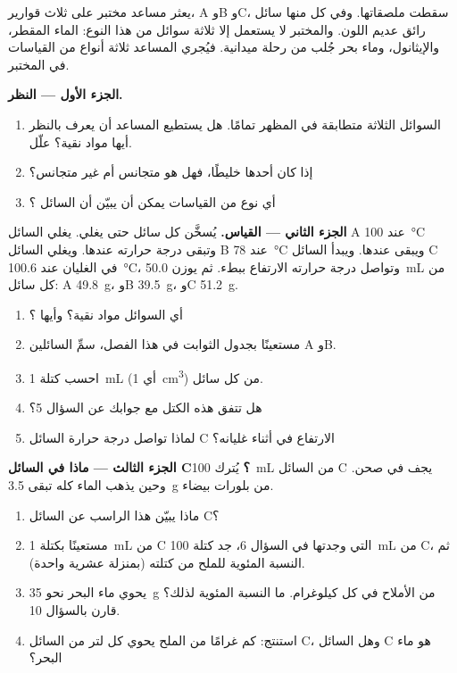 \begin{problem}
\label{pb:g6:pure-substances-and-mixtures:1}
يعثر مساعد مختبر على ثلاث قوارير، A وB وC، سقطت ملصقاتها. وفي كل
منها سائل رائق عديم اللون. والمختبر لا يستعمل إلا ثلاثة سوائل من هذا
النوع: الماء المقطر، والإيثانول، وماء بحر جُلب من رحلة ميدانية. فيُجري
المساعد ثلاثة أنواع من القياسات في المختبر.

\medskip
\noindent\textbf{الجزء الأول --- النظر.}
\begin{enumerate}
  \item السوائل الثلاثة متطابقة في المظهر تمامًا. هل يستطيع المساعد أن
        يعرف بالنظر أيها مواد نقية؟ علّل.
  \item إذا كان أحدها خليطًا، فهل هو متجانس أم غير متجانس؟
  \item أي نوع من القياسات يمكن أن يبيّن أن السائل ؟
\end{enumerate}

\medskip
\noindent\textbf{الجزء الثاني --- القياس.}
يُسخَّن كل سائل حتى يغلي. يغلي السائل A عند
\qty{100}{\celsius} وتبقى درجة حرارته عندها. ويغلي السائل B عند
\qty{78}{\celsius} ويبقى عندها. ويبدأ السائل C في الغليان عند
\qty{100.6}{\celsius}، وتواصل درجة حرارته الارتفاع ببطء. ثم
يوزن \qty{50.0}{mL} من كل سائل: A \qty{49.8}{g}، وB
\qty{39.5}{g}، وC \qty{51.2}{g}.
\begin{enumerate}[resume]
  \item أي السوائل مواد نقية؟ وأيها ؟
  \item مستعينًا بجدول الثوابت في هذا الفصل، سمِّ السائلين A
        وB.
  \item احسب كتلة \qty{1}{mL} (أي \qty{1}{cm^3}) من كل
        سائل.
  \item هل تتفق هذه الكتل مع جوابك عن السؤال 5؟
  \item لماذا تواصل درجة حرارة السائل C الارتفاع في أثناء غليانه؟
\end{enumerate}

\medskip
\noindent\textbf{الجزء الثالث --- ماذا في السائل C؟}
يُترك \qty{100}{mL} من السائل C يجف في صحن. وحين يذهب الماء كله
تبقى \qty{3.5}{g} من بلورات بيضاء.
\begin{enumerate}[resume]
  \item ماذا يبيّن هذا الراسب عن السائل C؟
  \item مستعينًا بكتلة \qty{1}{mL} من C التي وجدتها في السؤال 6، جد
        كتلة \qty{100}{mL} من C، ثم النسبة المئوية للملح من كتلته
        (بمنزلة عشرية واحدة).
  \item يحوي ماء البحر نحو \qty{35}{g} من الأملاح في كل كيلوغرام. ما
        النسبة المئوية لذلك؟ قارن بالسؤال 10.
  \item استنتج: كم غرامًا من الملح يحوي كل لتر من السائل C، وهل السائل C
        هو ماء البحر؟
\end{enumerate}
\end{problem}
